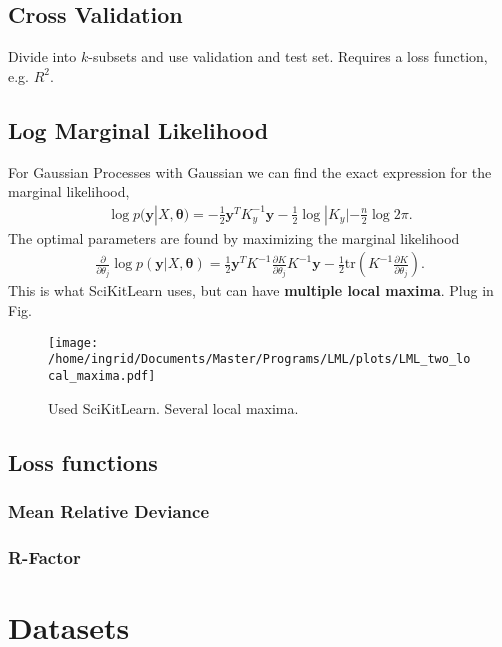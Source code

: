 \documentclass[twoside,english]{uiofysmaster}
\begin{document}
\subsection{Cross Validation}

Divide into $k$-subsets and use validation and test set. Requires a loss function, e.g. $R^2$.

\subsection{Log Marginal Likelihood}

For Gaussian Processes with Gaussian we can find the exact expression for the marginal likelihood,
\begin{align}
\log p(\textbf{y}|X, \boldsymbol{\theta}) = - \frac{1}{2} \textbf{y}^T K_y^{-1} \textbf{y} - \frac{1}{2} \log |K_y| - \frac{n}{2} \log 2 \pi.
\end{align}
The optimal parameters are found by maximizing the marginal likelihood
\begin{align}
\frac{\partial}{\partial \theta_j}
 \log p(\textbf{y}|X, \boldsymbol{\theta}) = \frac{1}{2} \textbf{y}^T K^{-1} \frac{\partial K}{\partial \theta_j} K^{-1} \textbf{y} - \frac{1}{2} \text{tr} (K^{-1} \frac{\partial K}{\partial \theta_j}).
\end{align}
This is what SciKitLearn uses, but can have \textbf{multiple local maxima}. Plug in Fig. 

\begin{figure}
\centering
\texttt{[image: /home/ingrid/Documents/Master/Programs/LML/plots/LML\_two\_local\_maxima.pdf]}
\caption{Used SciKitLearn. Several local maxima.}
\end{figure}

\subsection{Loss functions}

\subsubsection{Mean Relative Deviance}

\subsubsection{R-Factor}



\section{Datasets}
\end{document}
